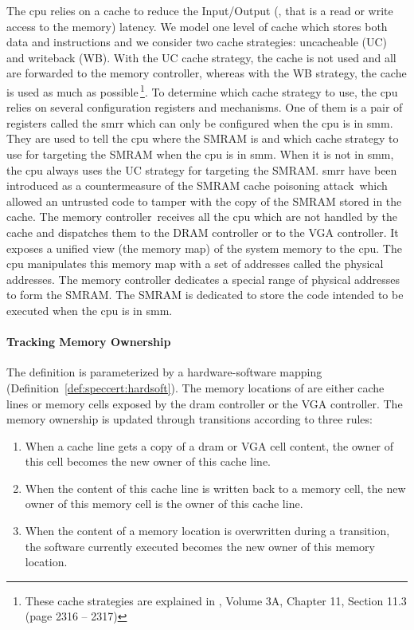 The \ac{cpu} relies on a cache to reduce the Input/Output (\IO, that is a read
or write access to the memory) latency.
%
We model one level of cache which stores both data and instructions and we
consider two cache strategies: uncacheable (UC) and writeback (WB).
%
With the UC cache strategy, the cache is not used and all \IOs are forwarded to
the memory controller, whereas with the WB strategy, the cache is used as much
as possible\,\footnote{These cache strategies are explained in
  \cite{intel2014manual}, Volume 3A, Chapter 11, Section 11.3 (page 2316 --
  2317)}.
%
To determine which cache strategy to use, the \ac{cpu} relies on several
configuration registers and mechanisms.
%
One of them is a pair of registers called the \ac{smrr} which can only be
configured when the \ac{cpu} is in \ac{smm}.
%
They are used to tell the \ac{cpu} where the SMRAM is and which cache strategy
to use for \IO targeting the SMRAM when the \ac{cpu} is in \ac{smm}.  When it is
not in \ac{smm}, the \ac{cpu} always uses the UC strategy for \IO targeting the
SMRAM.
%
\ac{smrr} have been introduced as a countermeasure of the SMRAM cache poisoning
attack\,\cite{wojtczuk2009smram,duflot2009smram} which allowed an untrusted code
to tamper with the copy of the SMRAM stored in the cache.
%
The memory controller\,\cite{intel2009mch} receives all the \ac{cpu} \IOs which
are not handled by the cache and dispatches them to the DRAM controller or to
the VGA controller. It exposes a unified view (the memory map) of the system
memory to the \ac{cpu}.
%
The \ac{cpu} manipulates this memory map with a set of addresses called the
physical addresses.
%
The memory controller dedicates a special range of physical addresses to form
the SMRAM.
%
The SMRAM is dedicated to store the code intended to be executed when the
\ac{cpu} is in \ac{smm}.

\paragraph{Tracking Memory Ownership}
%
The  definition is parameterized by a hardware-software
mapping  (Definition~\ref{def:speccert:hardsoft}).
%
The memory locations of  are either cache lines or memory
cells exposed by the \ac{dram} controller or the VGA controller.
%
The memory ownership is updated through transitions according to three rules:
%
\begin{enumerate}
\item When a cache line gets a copy of a \ac{dram} or VGA cell content, the
  owner of this cell becomes the new owner of this cache line.
%
\item When the content of this cache line is written back to a memory cell, the
  new owner of this memory cell is the owner of this cache line.
%
\item When the content of a memory location is overwritten during a transition,
  the software currently executed becomes the new owner of this memory location.
%
\end{enumerate}

